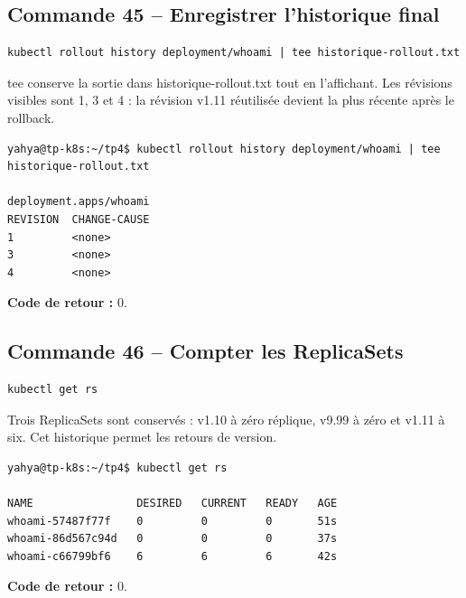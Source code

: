 \documentclass[11pt,a4paper]{article}
\begin{document}
\subsection{Commande 45 -- Enregistrer l’historique final}
\begin{lstlisting}
kubectl rollout history deployment/whoami | tee historique-rollout.txt
\end{lstlisting}
tee conserve la sortie dans historique-rollout.txt tout en l’affichant. Les révisions visibles sont 1, 3 et 4 : la révision v1.11 réutilisée devient la plus récente après le rollback.
\begin{tcolorbox}[terminal,title={Ubuntu / WSL2 -- Commande 45 -- rendu reconstitué}]
\begin{Verbatim}[fontsize=\scriptsize,breaklines=true,breakanywhere=true,breaksymbolleft={},breaksymbolright={}]
yahya@tp-k8s:~/tp4$ kubectl rollout history deployment/whoami | tee historique-rollout.txt

deployment.apps/whoami 
REVISION  CHANGE-CAUSE
1         <none>
3         <none>
4         <none>
\end{Verbatim}
\end{tcolorbox}
\textbf{Code de retour :} 0.

\subsection{Commande 46 -- Compter les ReplicaSets}
\begin{lstlisting}
kubectl get rs
\end{lstlisting}
Trois ReplicaSets sont conservés : v1.10 à zéro réplique, v9.99 à zéro et v1.11 à six. Cet historique permet les retours de version.
\begin{tcolorbox}[terminal,title={Ubuntu / WSL2 -- Commande 46 -- rendu reconstitué}]
\begin{Verbatim}[fontsize=\scriptsize,breaklines=true,breakanywhere=true,breaksymbolleft={},breaksymbolright={}]
yahya@tp-k8s:~/tp4$ kubectl get rs

NAME                DESIRED   CURRENT   READY   AGE
whoami-57487f77f    0         0         0       51s
whoami-86d567c94d   0         0         0       37s
whoami-c66799bf6    6         6         6       42s
\end{Verbatim}
\end{tcolorbox}
\textbf{Code de retour :} 0.
\end{document}
